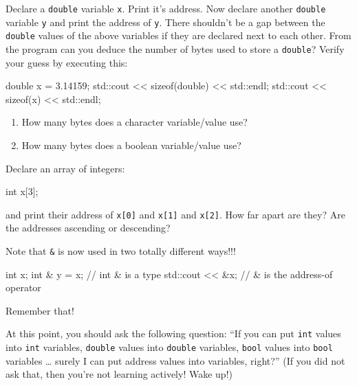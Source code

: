 \begin{ex}
Declare a \texttt{double} variable \texttt{x}. Print it's address. Now declare another \texttt{double} variable \texttt{y} and print the address of \texttt{y}. There shouldn't be a gap between the \texttt{double} values of the above variables if they are declared next to each other. From the program can you deduce the number of bytes used to store a \texttt{double}? Verify your guess by executing this:
\begin{consolethree}[escapeinside=||]
double x = 3.14159;
std::cout << sizeof(double) << std::endl;
std::cout << sizeof(x) << std::endl;
\end{consolethree}
\end{ex}

\begin{ex}

\begin{enumerate}
\item
  How many bytes does a character variable/value use?
\item
  How many bytes does a boolean variable/value use?
\end{enumerate}
\end{ex}

\begin{ex}
Declare an array of integers:
\begin{consolethree}[escapeinside=||]
int x[3];
\end{consolethree}

and print their address of \texttt{x[0]} and \texttt{x[1]} and
\texttt{x[2]}. How far apart are they? Are the addresses ascending or
descending?
\end{ex}


Note that \texttt{\&} is now used in two totally different ways!!!

\begin{consolethree}[escapeinside=||]
int x;
int & y = x;     // int & is a type
std::cout << &x; // & is the address-of operator
\end{consolethree}
Remember that!

\newpage{}

At this point, you should ask the following question: ``If you can put \texttt{int} values into \texttt{int} variables, \texttt{double} values into \texttt{double} variables, \texttt{bool} values into \texttt{bool} variables \ldots{} surely I can put address values into variables, right?'' (If you did not ask that, then you're not learning actively! Wake up!)

